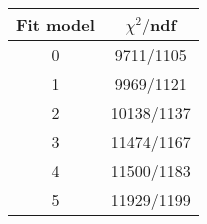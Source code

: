 \begin{tabular}{c|c}
Fit model & $\chi^2/$ndf \\
\hline
0 & 9711/1105\\
1 & 9969/1121\\
2 & 10138/1137\\
3 & 11474/1167\\
4 & 11500/1183\\
5 & 11929/1199\\
\end{tabular}

